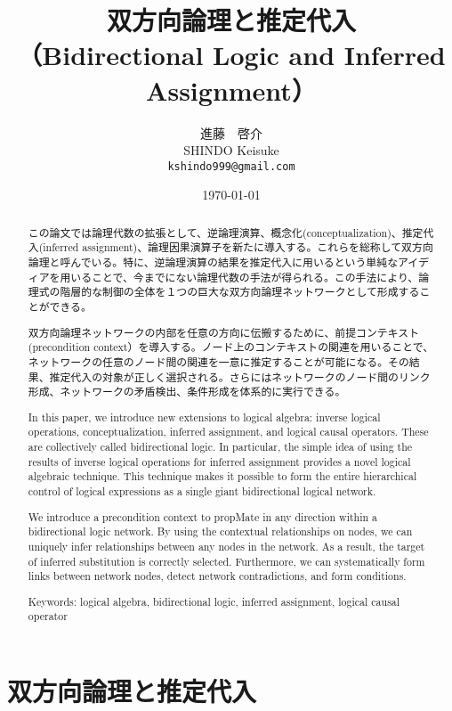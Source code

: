 \documentclass[12pt]{article}
\title{
  \large 双方向論理と推定代入
\\（Bidirectional Logic and Inferred Assignment）}
\author{
    \large 進藤　啓介 \\
    \large SHINDO Keisuke \\
    \texttt{kshindo999@gmail.com}
}
\date{\today}
\begin{document}
\maketitle
\thispagestyle{empty}

\begin{abstract}


この論文では論理代数の拡張として、逆論理演算、概念化(conceptualization)、推定代入(inferred
assignment)、論理因果演算子を新たに導入する。これらを総称して双方向論理と呼んでいる。特に、逆論理演算の結果を推定代入に用いるという単純なアイディアを用いることで、今までにない論理代数の手法が得られる。この手法により、論理式の階層的な制御の全体を１つの巨大な双方向論理ネットワークとして形成することができる。

双方向論理ネットワークの内部を任意の方向に伝搬するために、前提コンテキスト(precondition
context）を導入する。ノード上のコンテキストの関連を用いることで、ネットワークの任意のノード間の関連を一意に推定することが可能になる。その結果、推定代入の対象が正しく選択される。さらにはネットワークのノード間のリンク形成、ネットワークの矛盾検出、条件形成を体系的に実行できる。

In this paper, we introduce new extensions to logical algebra: inverse
logical operations, conceptualization, inferred assignment, and logical
causal operators. These are collectively called bidirectional logic. In
particular, the simple idea of using the results of inverse logical
operations for inferred assignment provides a novel logical algebraic
technique. This technique makes it possible to form the entire
hierarchical control of logical expressions as a single giant
bidirectional logical network.

We introduce a precondition context to propMate in any direction within
a bidirectional logic network. By using the contextual relationships on
nodes, we can uniquely infer relationships between any nodes in the
network. As a result, the target of inferred substitution is correctly
selected. Furthermore, we can systematically form links between network
nodes, detect network contradictions, and form conditions.

Keywords: logical algebra, bidirectional logic, inferred assignment,
logical causal operator
\end{abstract}

\clearpage
\tableofcontents

\clearpage
\section{双方向論理と推定代入}\label{ux53ccux65b9ux5411ux8ad6ux7406ux3068ux63a8ux5b9aux4ee3ux5165}
\end{document}
